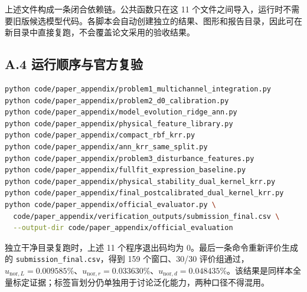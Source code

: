 上述文件构成一条闭合依赖链。公共函数只在这 11 个文件之间导入，运行时不需要旧版候选模型代码。各脚本会自动创建独立的结果、图形和报告目录，因此可在新目录中直接复跑，不会覆盖论文采用的验收结果。

\subsection*{A.4 运行顺序与官方复验}

\begin{lstlisting}[language=bash,basicstyle=\ttfamily\scriptsize,aboveskip=0.25em,belowskip=0pt]
python code/paper_appendix/problem1_multichannel_integration.py
python code/paper_appendix/problem2_d0_calibration.py
python code/paper_appendix/model_evolution_ridge_ann.py
python code/paper_appendix/physical_feature_library.py
python code/paper_appendix/compact_rbf_krr.py
python code/paper_appendix/ann_krr_same_split.py
python code/paper_appendix/problem3_disturbance_features.py
python code/paper_appendix/fullfit_expression_baseline.py
python code/paper_appendix/physical_stability_dual_kernel_krr.py
python code/paper_appendix/final_postcalibrated_dual_kernel_krr.py
python code/paper_appendix/official_evaluator.py \
  code/paper_appendix/verification_outputs/submission_final.csv \
  --output-dir code/paper_appendix/official_evaluation
\end{lstlisting}

独立干净目录复跑时，上述 11 个程序退出码均为 0。最后一条命令重新评价生成的 \texttt{submission\_final.csv}，得到 159 个窗口、30/30 评价组通过，$u_{\mathrm{nor},L}=0.009585\%$、$u_{\mathrm{nor},r}=0.033630\%$、$u_{\mathrm{nor},d}=0.048435\%$。该结果是同样本全量标定证据；标签盲划分仍单独用于讨论泛化能力，两种口径不得混用。
